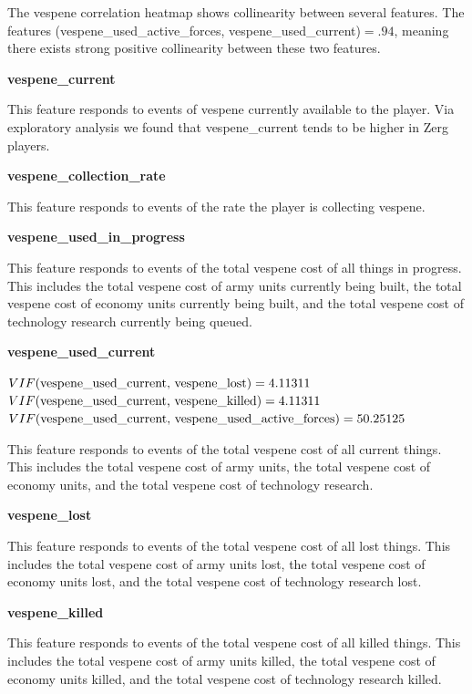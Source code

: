 \documentclass[a4paper,12pt]{report}
\newcommand{\msection}[1]{\noindent\textbf{#1}}
\begin{document}
The vespene correlation heatmap shows collinearity between several features. The features (vespene\_used\_active\_forces, vespene\_used\_current)$ = .94$, meaning there exists strong positive collinearity between these two features.

\msection{vespene\_current}

This feature responds to events of vespene currently available to the player. Via exploratory analysis we found that vespene\_current tends to be higher in Zerg players.

\msection{vespene\_collection\_rate}

This feature responds to events of the rate the player is collecting vespene. 

\msection{vespene\_used\_in\_progress}

This feature responds to events of the total vespene cost of all things in progress. This includes the total vespene cost of army units currently being built, the total vespene cost of economy units currently being built, and the total vespene cost of technology research currently being queued.

\msection{vespene\_used\_current}

$VIF(\text{vespene\_used\_current, vespene\_lost}) = \pgfmathparse{1/(1-(-.87)^2)}\pgfmathresult$ \\
$VIF(\text{vespene\_used\_current, vespene\_killed}) = \pgfmathparse{1/(1-(-.87)^2)}\pgfmathresult$ \\
$VIF(\text{vespene\_used\_current, vespene\_used\_active\_forces}) = \pgfmathparse{1/(1-(.99)^2)}\pgfmathresult$

This feature responds to events of the total vespene cost of all current things. This includes the total vespene cost of army units, the total vespene cost of economy units, and the total vespene cost of technology research.

\msection{vespene\_lost}

This feature responds to events of the total vespene cost of all lost things. This includes the total vespene cost of army units lost, the total vespene cost of economy units lost, and the total vespene cost of technology research lost.

\msection{vespene\_killed}

This feature responds to events of the total vespene cost of all killed things. This includes the total vespene cost of army units killed, the total vespene cost of economy units killed, and the total vespene cost of technology research killed.
\end{document}
